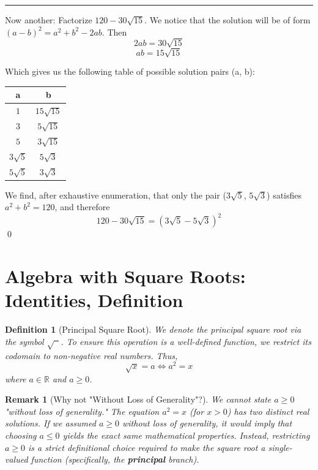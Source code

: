 \documentclass{article}
\newtheorem{remark}{Remark}
\newtheorem{definition}{Definition}
\begin{document}
\vspace{10pt}
\hrule
\vspace{10pt}

Now another: Factorize $120 - 30\sqrt{15}$.
We notice that the solution will be of form $(a - b)^2 = a^2 + b^2 - 2ab$. Then
\[
    2ab = 30\sqrt{15}
\]
\[
    ab = 15\sqrt{15}
\]

Which gives us the following table of possible solution pairs (a, b):
\begin{center}
    \begin{tabular}{c|c}
        a & b \\
        \hline
        \rule{0pt}{3ex} 
        $1$ & $15\sqrt{15}$ \\ 
        $3$ & $5\sqrt{15}$ \\ 
        $5$ & $3\sqrt{15}$ \\ 
        $3\sqrt{5}$ & $5\sqrt{3}$ \\ 
        $5\sqrt{5}$ & $3\sqrt{3}$
    \end{tabular}
\end{center}
We find, after exhaustive enumeration, that only the pair ($3\sqrt{5}$, $5\sqrt{3}$) satisfies $a^2 + b^2 = 120$, and therefore
\[
    120-30\sqrt{15} = (3\sqrt{5} - 5\sqrt{3})^2
\] \qed

\section{Algebra with Square Roots: Identities, Definition}
\begin{definition}[Principal Square Root]
    We denote the principal square root via the symbol $\sqrt{\phantom{x}}$. To ensure this operation is a well-defined function, we restrict its codomain to non-negative real numbers. Thus,
    \[
        \sqrt{x} = a \iff a^2 = x
    \]
    where $a \in \mathbb{R}$ and $a \ge 0$.
\end{definition}

\begin{remark}[Why not "Without Loss of Generality"?]
    We cannot state $a \ge 0$ "without loss of generality." The equation $a^2 = x$ (for $x > 0$) has two distinct real solutions. If we assumed $a \ge 0$ without loss of generality, it would imply that choosing $a \le 0$ yields the exact same mathematical properties. Instead, restricting $a \ge 0$ is a strict definitional choice required to make the square root a single-valued function (specifically, the \textbf{principal} branch).
\end{remark}
\end{document}
